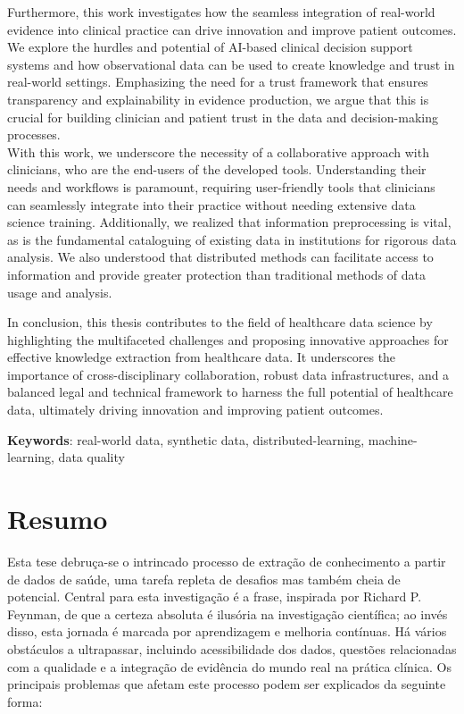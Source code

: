 Furthermore, this work investigates how the seamless integration of real-world evidence into clinical practice can drive innovation and improve patient outcomes. We explore the hurdles and potential of AI-based clinical decision support systems and how observational data can be used to create knowledge and trust in real-world settings. Emphasizing the need for a trust framework that ensures transparency and explainability in evidence production, we argue that this is crucial for building clinician and patient trust in the data and decision-making processes. \\

With this work, we underscore the necessity of a collaborative approach with clinicians, who are the end-users of the developed tools. Understanding their needs and workflows is paramount, requiring user-friendly tools that clinicians can seamlessly integrate into their practice without needing extensive data science training. Additionally, we realized that information preprocessing is vital, as is the fundamental cataloguing of existing data in institutions for rigorous data analysis. We also understood that distributed methods can facilitate access to information and provide greater protection than traditional methods of data usage and analysis.

In conclusion, this thesis contributes to the field of healthcare data science by highlighting the multifaceted challenges and proposing innovative approaches for effective knowledge extraction from healthcare data. It underscores the importance of cross-disciplinary collaboration, robust data infrastructures, and a balanced legal and technical framework to harness the full potential of healthcare data, ultimately driving innovation and improving patient outcomes.



\vspace*{10mm}\noindent
\textbf{Keywords}: real-world data, synthetic data, distributed-learning, machine-learning, data quality




\chapter*{Resumo}
Esta tese debruça-se o intrincado processo de extração de conhecimento a partir de dados de saúde, uma tarefa repleta de desafios mas também cheia de potencial. Central para esta investigação é a frase, inspirada por Richard P. Feynman, de que a certeza absoluta é ilusória na investigação científica; ao invés disso, esta jornada é marcada por aprendizagem e melhoria contínuas. Há vários obstáculos a ultrapassar, incluindo acessibilidade dos dados, questões relacionadas com a qualidade e a integração de evidência do mundo real na prática clínica. Os principais problemas que afetam este processo podem ser explicados da seguinte forma:

